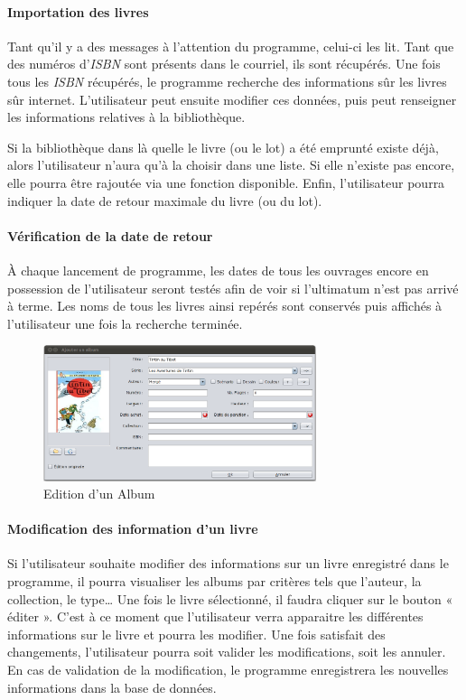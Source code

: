 \paragraph{Importation des livres}
Tant qu'il y a des messages à l'attention du programme, celui-ci les lit. 
Tant que des numéros d'\emph{ISBN} sont présents dans le courriel, ils sont récupérés. 
Une fois tous les \emph{ISBN} récupérés, le programme recherche des informations sûr les livres sûr internet.
L'utilisateur peut ensuite modifier ces données, puis peut renseigner les informations relatives à la bibliothèque. 

Si la bibliothèque dans là quelle le livre (ou le lot) a été emprunté existe déjà, 
alors l'utilisateur n'aura qu'à la choisir dans une liste. Si elle n'existe pas encore, elle pourra être rajoutée via une fonction disponible. 
Enfin, l'utilisateur pourra indiquer la date de retour maximale du livre (ou du lot).

\paragraph{Vérification de la date de retour}
À chaque lancement de programme, les dates de tous les ouvrages encore en possession de l'utilisateur seront testés afin de voir si l'ultimatum n'est pas arrivé à terme. 
Les noms de tous les livres ainsi repérés sont conservés puis affichés à l'utilisateur une fois la recherche terminée. 


\begin{figure}
\includegraphics[width=8cm]{../img/editionAlbum.png}
\caption{Edition d'un Album}
\end{figure}
\paragraph{Modification des information d'un livre}
Si l'utilisateur souhaite modifier des informations sur un livre enregistré dans le programme, il pourra visualiser les albums par critères tels que l'auteur, la collection, le type…
Une fois le livre sélectionné, il faudra cliquer sur le bouton « éditer ».  
C'est à ce moment que l'utilisateur verra apparaitre les différentes informations sur le livre et pourra les modifier.
Une fois satisfait des changements, l'utilisateur pourra soit valider les modifications, soit les annuler. 
En cas de validation de la modification, le programme enregistrera les nouvelles informations dans la base de données.  
